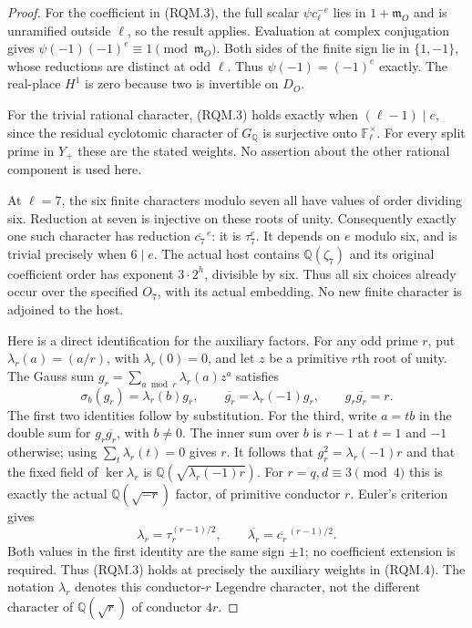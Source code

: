 \begin{proof}
For the coefficient in (RQM.3), the full scalar
$\psi c_\ell^{-e}$ lies in $1+\mathfrak m_O$ and is unramified
outside $\ell$, so the result applies. Evaluation at complex
conjugation gives $\psi(-1)(-1)^e\equiv1\pmod{\mathfrak m_O}$.
Both sides of the finite sign lie in $\{1,-1\}$, whose reductions
are distinct at odd $\ell$. Thus $\psi(-1)=(-1)^e$ exactly.
The real-place $H^1$ is zero because two is invertible on $D_O$.

For the trivial rational character, (RQM.3) holds exactly when
$(\ell-1)\mid e$, since the residual cyclotomic character of
$G_{\mathbb Q}$ is surjective onto $\mathbb F_\ell^\times$.
For every split prime in $Y_+$ these are the stated weights.
No assertion about the other rational component is used here.

At $\ell=7$, the six finite characters modulo seven all have
values of order dividing six. Reduction at seven is injective
on these roots of unity. Consequently exactly one such character
has reduction $\overline{c_7}^{\,e}$: it is $\tau_7^e$.
It depends on $e$ modulo six, and is trivial precisely when
$6\mid e$. The actual host contains $\mathbb Q(\zeta_7)$ and
its original coefficient order has exponent $3\cdot2^h$, divisible
by six. Thus all six choices already occur over the specified
$O_7$, with its actual embedding. No new finite character is
adjoined to the host.

Here is a direct identification for the auxiliary factors.
For any odd prime $r$, put $\lambda_r(a)=(a/r)$, with
$\lambda_r(0)=0$, and let $z$ be a primitive $r$th root of unity.
The Gauss sum $g_r=\sum_{a\bmod r}\lambda_r(a)z^a$ satisfies
\[
 \sigma_b(g_r)=\lambda_r(b)g_r,\qquad
 \overline{g_r}=\lambda_r(-1)g_r,\qquad
                         g_r\overline{g_r}=r.
 \tag{RQM.10}
\]
The first two identities follow by substitution. For the third,
write $a=tb$ in the double sum for $g_r\overline{g_r}$, with
$b\ne0$. The inner sum over $b$ is $r-1$ at $t=1$ and $-1$
otherwise; using $\sum_t\lambda_r(t)=0$ gives $r$.
It follows that $g_r^2=\lambda_r(-1)r$ and that the fixed field
of $\ker\lambda_r$ is $\mathbb Q(\sqrt{\lambda_r(-1)r})$.
For $r=q,d\equiv3\pmod4$ this is exactly the actual
$\mathbb Q(\sqrt{-r})$ factor, of primitive conductor $r$.
Euler's criterion gives
\[
                 \lambda_r=\tau_r^{(r-1)/2},
   \qquad\overline{\lambda_r}=\overline{c_r}^{\,(r-1)/2}.
 \tag{RQM.11}
\]
Both values in the first identity are the same sign $\pm1$;
no coefficient extension is required.
Thus (RQM.3) holds at precisely the auxiliary weights in
(RQM.4). The notation $\lambda_r$ denotes this conductor-$r$
Legendre character, not the different character of
$\mathbb Q(\sqrt r)$ of conductor $4r$.


\end{proof}
